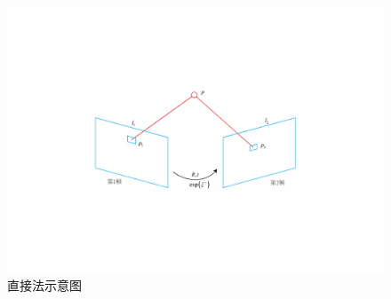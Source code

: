 \begin{figure}
\centering
\includegraphics[scale=0.3,angle=-90]{figures/Fig3-5.pdf}
\caption{直接法示意图}
\label{fig3.5}
\end{figure}

